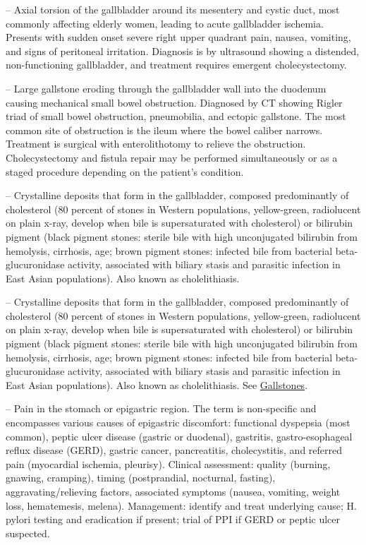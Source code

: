 -- Axial torsion of the gallbladder around its mesentery and cystic duct, most commonly affecting elderly women, leading to acute gallbladder ischemia. Presents with sudden onset severe right upper quadrant pain, nausea, vomiting, and signs of peritoneal irritation. Diagnosis is by ultrasound showing a distended, non-functioning gallbladder, and treatment requires emergent cholecystectomy.

-- Large gallstone eroding through the gallbladder wall into the duodenum causing mechanical small bowel obstruction. Diagnosed by CT showing Rigler triad of small bowel obstruction, pneumobilia, and ectopic gallstone. The most common site of obstruction is the ileum where the bowel caliber narrows. Treatment is surgical with enterolithotomy to relieve the obstruction. Cholecystectomy and fistula repair may be performed simultaneously or as a staged procedure depending on the patient's condition.

-- Crystalline deposits that form in the gallbladder, composed predominantly of cholesterol (80 percent of stones in Western populations, yellow-green, radiolucent on plain x-ray, develop when bile is supersaturated with cholesterol) or bilirubin pigment (black pigment stones: sterile bile with high unconjugated bilirubin from hemolysis, cirrhosis, age; brown pigment stones: infected bile from bacterial beta-glucuronidase activity, associated with biliary stasis and parasitic infection in East Asian populations). Also known as cholelithiasis.

-- Crystalline deposits that form in the gallbladder, composed predominantly of cholesterol (80 percent of stones in Western populations, yellow-green, radiolucent on plain x-ray, develop when bile is supersaturated with cholesterol) or bilirubin pigment (black pigment stones: sterile bile with high unconjugated bilirubin from hemolysis, cirrhosis, age; brown pigment stones: infected bile from bacterial beta-glucuronidase activity, associated with biliary stasis and parasitic infection in East Asian populations). Also known as cholelithiasis. See \hyperlink{Gallstones}{Gallstones}.

-- Pain in the stomach or epigastric region. The term is non-specific and encompasses various causes of epigastric discomfort: functional dyspepsia (most common), peptic ulcer disease (gastric or duodenal), gastritis, gastro-esophageal reflux disease (GERD), gastric cancer, pancreatitis, cholecystitis, and referred pain (myocardial ischemia, pleurisy). Clinical assessment: quality (burning, gnawing, cramping), timing (postprandial, nocturnal, fasting), aggravating/relieving factors, associated symptoms (nausea, vomiting, weight loss, hematemesis, melena). Management: identify and treat underlying cause; H. pylori testing and eradication if present; trial of PPI if GERD or peptic ulcer suspected.

